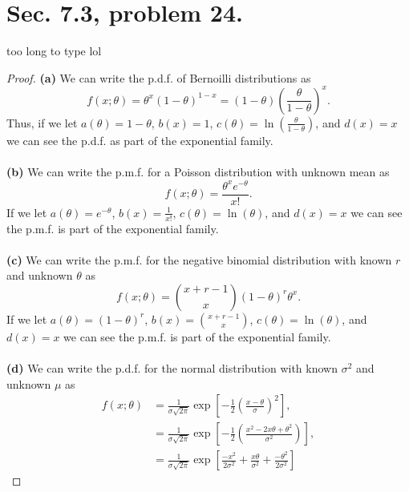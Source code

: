 \documentclass{article}
\newcommand{\pdf}{p.d.f. }
\newcommand{\pmf}{p.m.f. }
\newenvironment{hwproof}[1]
{
    #1
    \begin{proof}
}{
    \end{proof}
}
\begin{document}
\section{Sec. 7.3, problem 24.}
\begin{hwproof}
    {
        too long to type lol
    }
    \textbf{(a)}
    We can write the \pdf of Bernoilli distributions as
    \begin{equation*}
        f(x;\theta) = \theta^x (1-\theta)^{1-x} =
        (1-\theta)\left(\frac{\theta}{1 - \theta}\right)^x.
    \end{equation*}
    Thus, if we let $a(\theta) = 1-\theta$, $b(x) = 1$,
    $c(\theta) = \ln\left(\frac{\theta}{1 - \theta}\right)$, and $d(x) = x$ we can see the \pdf
    as part of the exponential family.
    \\
    \\
    \textbf{(b)}
    We can write the \pmf for a Poisson distribution with unknown mean as
    \begin{equation*}
        f(x;\theta) = \frac{\theta^xe^{-\theta}}{x!}.
    \end{equation*}
    If we let $a(\theta) = e^{-\theta}$, $b(x) = \frac{1}{x!}$,
    $c(\theta) = \ln(\theta)$, and $d(x) = x$ we can see the \pmf is part
    of the exponential family.
    \\
    \\
    \textbf{(c)}
    We can write the \pmf for the negative binomial distribution with known $r$ and
    unknown $\theta$ as
    \begin{equation*}
        f(x;\theta) = \binom{x + r - 1}{x}(1-\theta)^r \theta^x.
    \end{equation*}
    If we let $a(\theta) = (1-\theta)^r$, $b(x) = \binom{x+r-1}{x}$,
    $c(\theta) = \ln(\theta)$, and $d(x) = x$ we can see the \pmf is part
    of the exponential family.
    \\
    \\
    \textbf{(d)}
    We can write the \pdf for the normal distribution with known $\sigma^2$ and
    unknown $\mu$ as
    \begin{align*}
        f(x;\theta) & = \frac{1}{\sigma\sqrt{2\pi}}\exp\left[-\frac{1}{2}\left(\frac{x - \theta}{\sigma}\right)^2\right],                       \\
                    & = \frac{1}{\sigma\sqrt{2\pi}}\exp\left[-\frac{1}{2}\left(\frac{x^2 - 2x\theta + \theta^2}{\sigma^2}\right)\right],        \\
                    & = \frac{1}{\sigma\sqrt{2\pi}}\exp\left[\frac{-x^2}{2\sigma^2}+\frac{x\theta}{\sigma^2}+\frac{-\theta^2}{2\sigma^2}\right]

\end{align*}
\end{hwproof}
\end{document}
